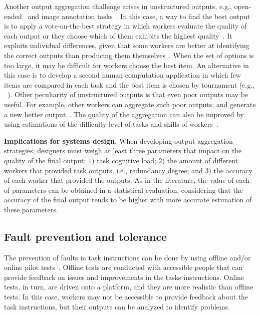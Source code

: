 \documentclass[11pt]{bmc_article_s50}
\begin{document}
Another output aggregation challenge arises in unstructured outputs, e.g., open-ended~\cite{Bernstein:2010,Sun:Hcomp:2011} {\color{black}and image annotation tasks~\cite{Salek:2013}}. In this case, a way to find the best output is to apply a vote-on-the-best strategy in which workers evaluate the quality of each output or they choose which of them exhibits the highest quality~\cite{Kulkarni2011b}. It exploits individual differences, given that some workers are better at identifying the correct outputs than producing them themselves~\cite{Sun:Hcomp:2011}. When the set of options is too large, it may be difficult for workers choose the best item. An alternative in this case is to develop a second human computation application in which few items are compared in each task and the best item is chosen by tournament (e.g., ~\cite{Sun:Hcomp:2011,Venetis:2012}). Other peculiarity of unstructured outputs is that even poor outputs may be useful. For example, other workers can aggregate such poor outputs, and generate a new better output~\cite{Kulkarni2012}. {\color{black}The quality of the aggregation can also be improved by using estimations of the difficulty level of tasks and skills of workers~\cite{Salek:2013}.}

\textbf{Implications for systems design.} When developing output aggregation strategies, designers must weigh at least three parameters that impact on the quality of the final output: $1)$ task cognitive load; $2)$ the amount of different workers that provided task outputs, i.e., redundancy degree; and $3)$ the accuracy of each worker that provided the outputs. As in the literature, the value of each of parameters can be obtained in a statistical evaluation, considering that the accuracy of the final output tends to be higher with more accurate estimation of these parameters.

\subsection{Fault prevention and tolerance}

The prevention of faults in task instructions can be done by using offline and/or online pilot tests~\cite{Chen:chiHcomp:2011}. Offline tests are conducted with accessible people that can provide feedback on issues and improvements in the tasks instructions. Online tests, in turn, are driven onto a platform, and they are more realistic than offline tests. In this case, workers may not be accessible to provide feedback about the task instructions, but their outputs can be analyzed to identify problems.
\end{document}

